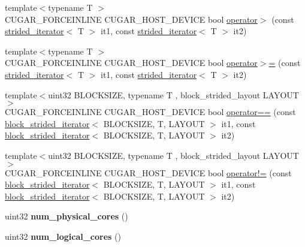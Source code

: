 \begin{DoxyCompactItemize}
\item 
{\footnotesize template$<$typename T $>$ }\\C\+U\+G\+A\+R\+\_\+\+F\+O\+R\+C\+E\+I\+N\+L\+I\+NE C\+U\+G\+A\+R\+\_\+\+H\+O\+S\+T\+\_\+\+D\+E\+V\+I\+CE bool \hyperlink{group___iterators_ga1e9e6257c01330e7b3620c9f3a81ee8f}{operator$>$} (const \hyperlink{structcugar_1_1strided__iterator}{strided\+\_\+iterator}$<$ T $>$ it1, const \hyperlink{structcugar_1_1strided__iterator}{strided\+\_\+iterator}$<$ T $>$ it2)
\item 
{\footnotesize template$<$typename T $>$ }\\C\+U\+G\+A\+R\+\_\+\+F\+O\+R\+C\+E\+I\+N\+L\+I\+NE C\+U\+G\+A\+R\+\_\+\+H\+O\+S\+T\+\_\+\+D\+E\+V\+I\+CE bool \hyperlink{group___iterators_ga9e4c4ee0e4663d9e1c671a22056c9533}{operator$>$=} (const \hyperlink{structcugar_1_1strided__iterator}{strided\+\_\+iterator}$<$ T $>$ it1, const \hyperlink{structcugar_1_1strided__iterator}{strided\+\_\+iterator}$<$ T $>$ it2)
\item 
{\footnotesize template$<$uint32 B\+L\+O\+C\+K\+S\+I\+ZE, typename T , block\+\_\+strided\+\_\+layout L\+A\+Y\+O\+UT$>$ }\\C\+U\+G\+A\+R\+\_\+\+F\+O\+R\+C\+E\+I\+N\+L\+I\+NE C\+U\+G\+A\+R\+\_\+\+H\+O\+S\+T\+\_\+\+D\+E\+V\+I\+CE bool \hyperlink{group___iterators_ga465edad50b0d8fadcb83a0eb90255327}{operator==} (const \hyperlink{structcugar_1_1block__strided__iterator}{block\+\_\+strided\+\_\+iterator}$<$ B\+L\+O\+C\+K\+S\+I\+ZE, T, L\+A\+Y\+O\+UT $>$ it1, const \hyperlink{structcugar_1_1block__strided__iterator}{block\+\_\+strided\+\_\+iterator}$<$ B\+L\+O\+C\+K\+S\+I\+ZE, T, L\+A\+Y\+O\+UT $>$ it2)
\item 
{\footnotesize template$<$uint32 B\+L\+O\+C\+K\+S\+I\+ZE, typename T , block\+\_\+strided\+\_\+layout L\+A\+Y\+O\+UT$>$ }\\C\+U\+G\+A\+R\+\_\+\+F\+O\+R\+C\+E\+I\+N\+L\+I\+NE C\+U\+G\+A\+R\+\_\+\+H\+O\+S\+T\+\_\+\+D\+E\+V\+I\+CE bool \hyperlink{group___iterators_gae35c875eb7c9a47d37f677f1df67f7f9}{operator!=} (const \hyperlink{structcugar_1_1block__strided__iterator}{block\+\_\+strided\+\_\+iterator}$<$ B\+L\+O\+C\+K\+S\+I\+ZE, T, L\+A\+Y\+O\+UT $>$ it1, const \hyperlink{structcugar_1_1block__strided__iterator}{block\+\_\+strided\+\_\+iterator}$<$ B\+L\+O\+C\+K\+S\+I\+ZE, T, L\+A\+Y\+O\+UT $>$ it2)
\item 
uint32 {\bfseries num\+\_\+physical\+\_\+cores} ()
\item 
uint32 {\bfseries num\+\_\+logical\+\_\+cores} ()
\item 

\end{DoxyCompactItemize}
